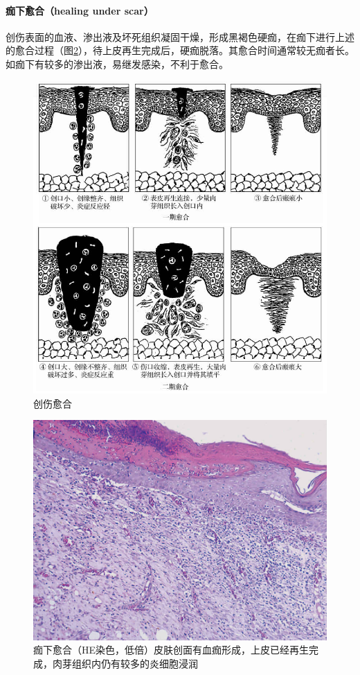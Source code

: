 \paragraph{痂下愈合（healing under scar）}
创伤表面的血液、渗出液及坏死组织凝固干燥，形成黑褐色硬痂，在痂下进行上述的愈合过程（图\ref{fig2-8}），待上皮再生完成后，硬痂脱落。其愈合时间通常较无痂者长。如痂下有较多的渗出液，易继发感染，不利于愈合。
\begin{figure}[!htbp]
	\centering
	\includegraphics{./images/Image00030.jpg}
	\caption{创伤愈合}
	\label{fig2-7}
\end{figure}

\begin{figure}[!htbp]
	\centering
	\includegraphics{./images/Image00031.jpg}
	\caption{痂下愈合（HE染色，低倍）{\small 皮肤创面有血痂形成，上皮已经再生完成，肉芽组织内仍有较多的炎细胞浸润}}
	\label{fig2-8}
\end{figure}


